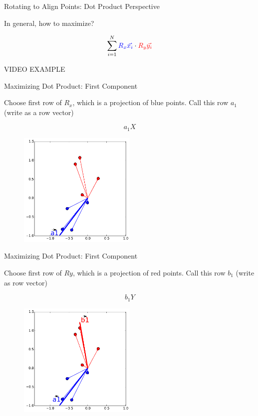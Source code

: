 \documentclass{beamer}
\begin{document}
\begin{frame}{Rotating to Align Points: Dot Product Perspective}

In general, how to maximize?

\[ \sum_{i = 1}^N \textcolor{blue}{R_x \vec{x_i}} \cdot \textcolor{red}{R_y \vec{y_i}} \]

VIDEO EXAMPLE


\end{frame}

\begin{frame}{Maximizing Dot Product: First Component}

Choose first row of $R_x$, which is a projection of blue points.  Call this row $a_1$ (write as a row vector)

\[ a_1X \]

\begin{figure}[t]
	\centering
    \includegraphics[width=0.5\textwidth]{2DProcrustesProj1.pdf}
\end{figure}


\end{frame}


\begin{frame}{Maximizing Dot Product: First Component}

Choose first row of $Ry$, which is a projection of red points.  Call this row $b_1$ (write as row vector)

\[ b_1 Y \]

\begin{figure}[t]
	\centering
    \includegraphics[width=0.5\textwidth]{2DProcrustesProj2.pdf}
\end{figure}


\end{frame}
\end{document}
